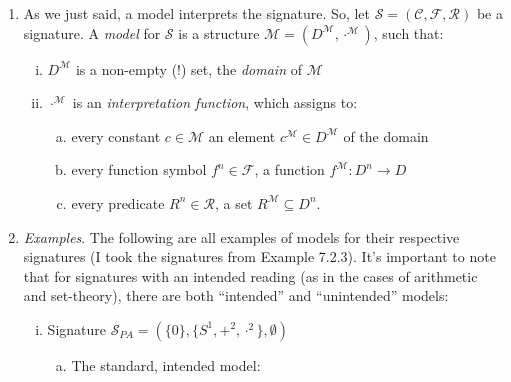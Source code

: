 	\begin{enumerate}[\thesection.1]

		\item As we just said, a model interprets the signature. So, let $\mathcal{S}=(\mathcal{C}, \mathcal{F}, \mathcal{R})$ be a signature. A \emph{model} for $\mathcal{S}$ is a structure $\mathcal{M}=(D^\mathcal{M},\cdot^\mathcal{M})$, such that:
		\begin{enumerate}[(i)]
		
			\item $D^\mathcal{M}$ is a non-empty (!) set, the \emph{domain} of $\mathcal{M}$
			
			\item $\cdot^\mathcal{M}$ is an \emph{interpretation function}, which assigns to:
			\begin{enumerate}[(a)]
			
				\item every constant $c\in\mathcal{M}$ an element $c^\mathcal{M}\in D^\mathcal{M}$ of the domain
				
				\item every function symbol $f^n\in\mathcal{F}$, a function $f^\mathcal{M}:D^n\to D$
				
				\item every predicate $R^n\in\mathcal{R}$, a set $R^\mathcal{M}\subseteq D^n$.
			
			\end{enumerate}
					
		\end{enumerate}
		
		\item \emph{Examples}. The following are all examples of models for their respective signatures (I took the signatures from Example 7.2.3). It's important to note that for signatures with an intended reading (as in the cases of arithmetic and set-theory), there are both ``intended'' and ``unintended'' models:
		
			\begin{enumerate}[(i)]
			
					
				\item Signature $\mathcal{S}_{PA}=(\{0\}, \{S^1, +^2, \cdot^2\}, \emptyset)$
				
				\begin{enumerate}[(a)]
				
					\item The standard, intended model:
					
						\begin{itemize}
					

\end{itemize}
\end{enumerate}
\end{enumerate}
\end{enumerate}
